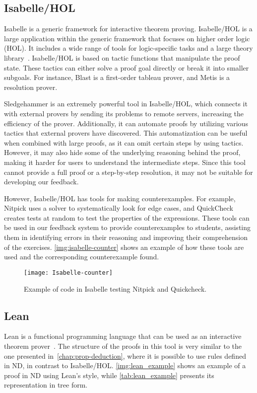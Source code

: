 \subsection{Isabelle/HOL}
Isabelle is a generic framework for interactive theorem proving. Isabelle/HOL is a large application within the generic framework that focuses on higher order logic (HOL). It includes a wide range of tools for logic-specific tasks and a large theory library~\cite{wenzel_the,blanchette_automatic}. Isabelle/HOL is based on tactic functions that manipulate the proof state. These tactics can either solve a proof goal directly or break it into smaller subgoals. For instance, Blast is a first-order tableau prover, and Metis is a resolution prover.

Sledgehammer is an extremely powerful tool in Isabelle/HOL, which connects it with external provers by sending its problems to remote servers, increasing the efficiency of the prover. Additionally, it can automate proofs by utilizing various tactics that external provers have discovered. This automatization can be useful when combined with large proofs, as it can omit certain steps by using tactics. However, it may also hide some of the underlying reasoning behind the proof, making it harder for users to understand the intermediate steps. Since this tool cannot provide a full proof or a step-by-step resolution, it may not be suitable for developing our feedback.

However, Isabelle/HOL has tools for making counterexamples. For example, Nitpick uses a solver to systematically look for edge cases, and QuickCheck creates tests at random to test the properties of the expressions. These tools can be used in our feedback system to provide counterexamples to students, assisting them in identifying errors in their reasoning and improving their comprehension of the exercises. \autoref{img:isabelle-counter} shows an example of how these tools are used and the corresponding counterexample found.
\begin{figure}[htbp]
    \centering
    \texttt{[image: Isabelle-counter]}
    \caption{Example of code in Isabelle testing Nitpick and Quickcheck.}
    \label{img:isabelle-counter}
\end{figure}

\subsection{Lean}
\label{chap:lean}
Lean is a functional programming language that can be used as an interactive theorem prover~\cite{programming}. The structure of the proofs in this tool is very similar to the one presented in~\autoref{chap:prop-deduction}, where it is possible to use rules defined in \gls{ND}, in contrast to Isabelle/HOL. \autoref{img:lean_example} shows an example of a proof in \gls{ND} using Lean's style, while \autoref{tab:lean_example} presents its representation in tree form.

